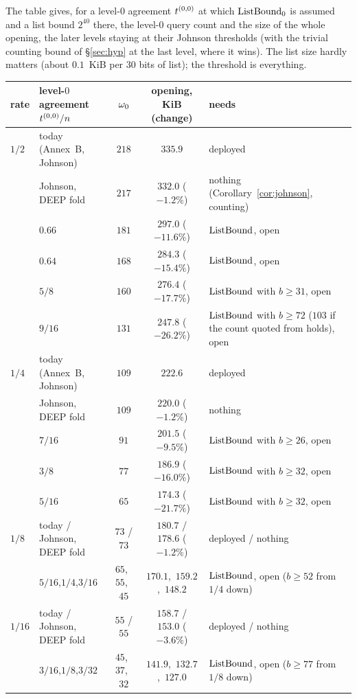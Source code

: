 The table gives, for a level-$0$ agreement $t^{(0,0)}$ at which $\mathrm{ListBound}_0$ is assumed and a list bound $2^{40}$ there, the level-$0$ query count and the size of the whole opening, the later levels staying at their Johnson thresholds (with the trivial counting bound of \S\ref{sec:hyp} at the last level, where it wins). The list size hardly matters (about $0.1$~KiB per $30$ bits of list); the threshold is everything.
\begin{center}
\small
\begin{tabular}{@{}llccL{0.24\textwidth}@{}}
\toprule
rate & level-$0$ agreement $t^{(0,0)}/n$ & $\omega_0$ & opening, KiB (change) & needs\\
\midrule
$1/2$ & today (Annex~B, Johnson) & $218$ & $335.9$ & deployed\\
 & Johnson, DEEP fold & $217$ & $332.0$ ($-1.2\%$) & nothing (Corollary~\ref{cor:johnson}, counting)\\
 & $0.66$ & $181$ & $297.0$ ($-11.6\%$) & $\mathrm{ListBound}$, open\\
 & $0.64$ & $168$ & $284.3$ ($-15.4\%$) & $\mathrm{ListBound}$, open\\
 & $5/8$ & $160$ & $276.4$ ($-17.7\%$) & $\mathrm{ListBound}$ with $b\ge31$, open\\
 & $9/16$ & $131$ & $247.8$ ($-26.2\%$) & $\mathrm{ListBound}$ with $b\ge72$ ($103$ if the count quoted from \cite{DKTZ26} holds), open\\
\addlinespace
$1/4$ & today (Annex~B, Johnson) & $109$ & $222.6$ & deployed\\
 & Johnson, DEEP fold & $109$ & $220.0$ ($-1.2\%$) & nothing\\
 & $7/16$ & $91$ & $201.5$ ($-9.5\%$) & $\mathrm{ListBound}$ with $b\ge26$, open\\
 & $3/8$ & $77$ & $186.9$ ($-16.0\%$) & $\mathrm{ListBound}$ with $b\ge32$, open\\
 & $5/16$ & $65$ & $174.3$ ($-21.7\%$) & $\mathrm{ListBound}$ with $b\ge32$, open\\
\addlinespace
$1/8$ & today / Johnson, DEEP fold & $73$ / $73$ & $180.7$ / $178.6$ ($-1.2\%$) & deployed / nothing\\
 & $5/16$,\quad$1/4$,\quad$3/16$ & $65$,\ $55$,\ $45$ & $170.1$,\ $159.2$,\ $148.2$ & $\mathrm{ListBound}$, open ($b\ge52$ from $1/4$ down)\\
\addlinespace
$1/16$ & today / Johnson, DEEP fold & $55$ / $55$ & $158.7$ / $153.0$ ($-3.6\%$) & deployed / nothing\\
 & $3/16$,\quad$1/8$,\quad$3/32$ & $45$,\ $37$,\ $32$ & $141.9$,\ $132.7$,\ $127.0$ & $\mathrm{ListBound}$, open ($b\ge77$ from $1/8$ down)\\
\bottomrule
\end{tabular}
\end{center}
